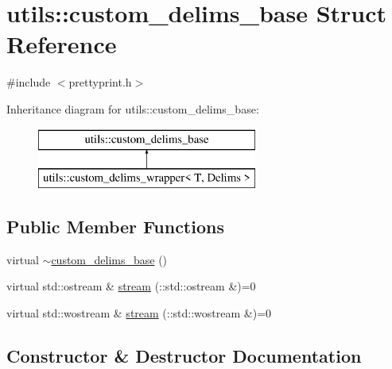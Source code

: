 \hypertarget{structutils_1_1custom__delims__base}{}\section{utils\+::custom\+\_\+delims\+\_\+base Struct Reference}
\label{structutils_1_1custom__delims__base}


{\ttfamily \#include $<$prettyprint.\+h$>$}

Inheritance diagram for utils\+::custom\+\_\+delims\+\_\+base\+:\begin{figure}[H]
\begin{center}
\leavevmode
\includegraphics[height=2.000000cm]{de/d73/structutils_1_1custom__delims__base}
\end{center}
\end{figure}
\subsection*{Public Member Functions}
\begin{DoxyCompactItemize}
\item 
virtual \mbox{\hyperlink{structutils_1_1custom__delims__base_a93035307cf42097e3cefb36f25f078f2}{$\sim$custom\+\_\+delims\+\_\+base}} ()
\item 
virtual std\+::ostream \& \mbox{\hyperlink{structutils_1_1custom__delims__base_a8889bdbb3f4873107a9d50ab0f6b2382}{stream}} (\+::std\+::ostream \&)=0
\item 
virtual std\+::wostream \& \mbox{\hyperlink{structutils_1_1custom__delims__base_a38f434e7fbacb0fcdca49b0eb8334188}{stream}} (\+::std\+::wostream \&)=0
\end{DoxyCompactItemize}


\subsection{Constructor \& Destructor Documentation}
\mbox{\label{structutils_1_1custom__delims__base_a93035307cf42097e3cefb36f25f078f2}} 
